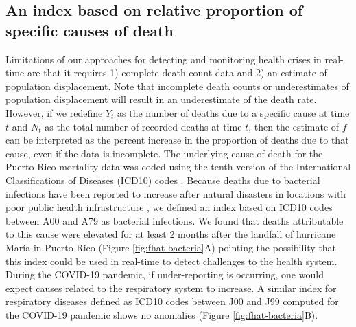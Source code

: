 \documentclass[11pt]{article}
\begin{document}
\subsection{An index based on relative proportion of specific causes of death}
\label{subsec:causes-deaths}

Limitations of our approaches for detecting and monitoring health crises in real-time are that it requires 1) complete death count data and 2) an estimate of population displacement. Note that incomplete death counts or underestimates of population displacement will result in an underestimate of the death rate. However, if we redefine $Y_t$ as the number of deaths due to a specific cause at time $t$ and $N_t$ as the total number of recorded deaths at time $t$, then the estimate of $f$ can be interpreted as the percent increase in the proportion of deaths due to that cause, even if the data is incomplete. The underlying cause of death for the Puerto Rico mortality data was coded using the tenth version of the International Classifications of Diseases (ICD10) codes \cite{world2004icd}. Because deaths due to bacterial infections have been reported to increase after natural disasters in locations with poor public health infrastructure \cite{ligon2006infectious, cook200810th}, we defined an index based on ICD10 codes between A00 and A79 as bacterial infections. We found that deaths attributable to this cause were elevated for at least 2 months after the landfall of hurricane Mar\'ia in Puerto Rico (Figure \ref{fig:fhat-bacteria}A) pointing the possibility that this index could be used in real-time to detect challenges to the health system. During the COVID-19 pandemic, if under-reporting is occurring, one would expect causes related to the respiratory system to increase. A similar index for respiratory diseases defined as ICD10 codes between J00 and J99 computed for the COVID-19 pandemic shows no anomalies  (Figure \ref{fig:fhat-bacteria}B).
\end{document}
